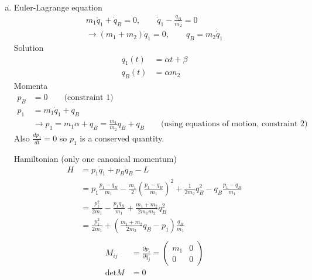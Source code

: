 \documentclass[10pt,a4paper]{report}
\theoremstyle{definition}
\begin{document}
\begin{enumerate}[a)]
\item Euler-Lagrange equation
\begin{align}
m_1\ddot{q}_1+\dot{q}_B=0,\qquad \dot{q}_1-\frac{q_B}{m_2}=0\\
\rightarrow (m_1+m_2)\ddot{q}_1=0,\qquad q_B=m_2\dot{q}_1
\end{align}
Solution
\begin{align}
q_1(t)&=\alpha t+\beta\\
q_B(t)&=\alpha m_2
\end{align}
Momenta
\begin{align}
p_B&=0\qquad\text{(constraint 1)}\\
p_1&=m_1\dot{q}_1+q_B\\
&\rightarrow p_1=m_1\alpha+q_B=\frac{m_1}{m_2}q_B+q_B\qquad\text{(using equations of motion, constraint 2)}
\end{align}
Also $\frac{dp_1}{dt}=0$ so $p_1$ is a conserved quantity.


Hamiltonian (only one canonical momentum)
\begin{align}
H&=p_1\dot{q}_1+p_B\dot{q}_B-L\\
&=p_1\frac{p_1-q_B}{m_1}-\frac{m_1}{2}\left(\frac{p_1-q_B}{m_1}\right)^2+\frac{1}{2m_2}q_B^2-q_B\frac{p_1-q_B}{m_1}\\
&=\frac{p_1^2}{2m_1}-\frac{p_1q_B}{m_1}+\frac{m_1+m_2}{2m_1m_2}q_B^2\\
&=\frac{p_1^2}{2m_1}+\left(\frac{m_1+m_2}{2m_2}q_B-p_1\right)\frac{q_B}{m_1}\\
\end{align}
\begin{align}
M_{ij}&=\frac{\partial p_i}{\partial \dot{q}_j}=\left(\begin{array}{cc}
m_1 & 0\\
0 & 0
\end{array}\right)\\
\text{det}M&=0
\end{align}

\end{enumerate}
\end{document}
